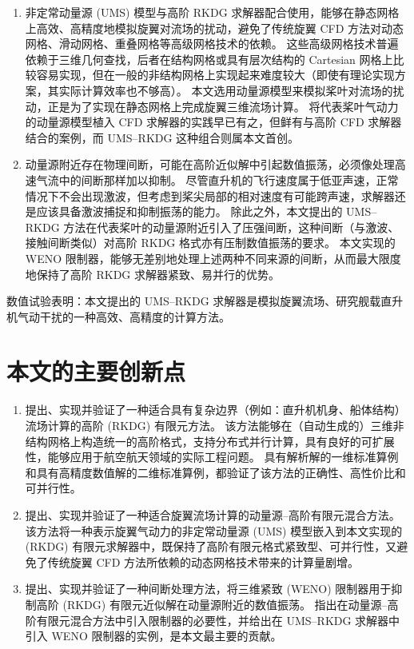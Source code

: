 \begin{enumerate}[wide]
\item 非定常动量源 (UMS) 模型与高阶 RKDG 求解器配合使用，能够在静态网格上高效、高精度地模拟旋翼对流场的扰动，避免了传统旋翼 CFD 方法对动态网格、滑动网格、重叠网格等高级网格技术的依赖。
这些高级网格技术普遍依赖于三维几何查找，后者在结构网格或具有层次结构的 Cartesian 网格上比较容易实现，但在一般的非结构网格上实现起来难度较大（即使有理论实现方案，其实际计算效率也不够高）。
本文选用动量源模型来模拟桨叶对流场的扰动，正是为了实现在静态网格上完成旋翼三维流场计算。
将代表桨叶气动力的动量源模型植入 CFD 求解器的实践早已有之，但鲜有与高阶 CFD 求解器结合的案例，而 UMS--RKDG 这种组合则属本文首创。

\item 动量源附近存在物理间断，可能在高阶近似解中引起数值振荡，必须像处理高速气流中的间断那样加以抑制。
尽管直升机的飞行速度属于低亚声速，正常情况下不会出现激波，但考虑到桨尖局部的相对速度有可能跨声速，求解器还是应该具备激波捕捉和抑制振荡的能力。
除此之外，本文提出的 UMS--RKDG 方法在代表桨叶的动量源附近引入了压强间断，这种间断（与激波、接触间断类似）对高阶 RKDG 格式亦有压制数值振荡的要求。
本文实现的 WENO 限制器，能够无差别地处理上述两种不同来源的间断，从而最大限度地保持了高阶 RKDG 求解器紧致、易并行的优势。
\end{enumerate}


数值试验表明：本文提出的 UMS--RKDG 求解器是模拟旋翼流场、研究舰载直升机气动干扰的一种高效、高精度的计算方法。


\section*{本文的主要创新点}
\begin{enumerate}[wide]
\item 提出、实现并验证了一种适合具有复杂边界（例如：直升机机身、船体结构）流场计算的高阶 (RKDG) 有限元方法。
该方法能够在（自动生成的）三维非结构网格上构造统一的高阶格式，支持分布式并行计算，具有良好的可扩展性，能够应用于航空航天领域的实际工程问题。
具有解析解的一维标准算例和具有高精度数值解的二维标准算例，都验证了该方法的正确性、高性价比和可并行性。

\item 提出、实现并验证了一种适合旋翼流场计算的动量源--高阶有限元混合方法。
该方法将一种表示旋翼气动力的非定常动量源 (UMS) 模型嵌入到本文实现的 (RKDG) 有限元求解器中，既保持了高阶有限元格式紧致型、可并行性，又避免了传统旋翼 CFD 方法所依赖的动态网格技术带来的计算量剧增。

\item 提出、实现并验证了一种间断处理方法，将三维紧致 (WENO) 限制器用于抑制高阶 (RKDG) 有限元近似解在动量源附近的数值振荡。
指出在动量源--高阶有限元混合方法中引入限制器的必要性，并给出在 UMS--RKDG 求解器中引入 WENO 限制器的实例，是本文最主要的贡献。
\end{enumerate}


